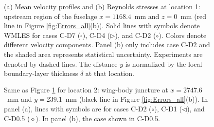 \documentclass{ctr}
\begin{document}
\begin{figure}
\begin{center}
\hspace{0.5cm}
\end{center}
\caption{(a) Mean velocity profiles and (b) Reynolds stresses at
  location 1: upstream region of the fuselage $x=1168.4$~mm and
  $z=0$~mm (red line in Figure \ref{fig:Errors_all}(b)). Solid lines
  with symbols denote WMLES for cases C-D7 ($\square$), C-D4
  ($\triangleright$), and C-D2 ($\circ$). Colors denote different
  velocity components. Panel (b) only includes case C-D2 and the
  shaded area represents statistical uncertainty. Experiments are
  denoted by dashed lines. The distance $y$ is normalized by the local
  boundary-layer thickness $\delta$ at that
  location. \label{fig:fuselage}}
\end{figure}
%
\begin{figure}
\begin{center}
  \hspace{0.5cm}
\end{center}
\caption{Same as Figure \ref{fig:fuselage} for location 2: wing-body
  juncture at $x=2747.6$~mm and $y=239.1$~mm (black line in Figure
  \ref{fig:Errors_all}(b)). In panel (a), lines with symbols are for
  cases C-D2 ($\circ$), C-D1 ($\triangleleft$), and C-D0.5
  ($\diamond$). In panel (b), the case shown in
  C-D0.5. \label{fig:juncture}}
\end{figure}
%
\end{document}
